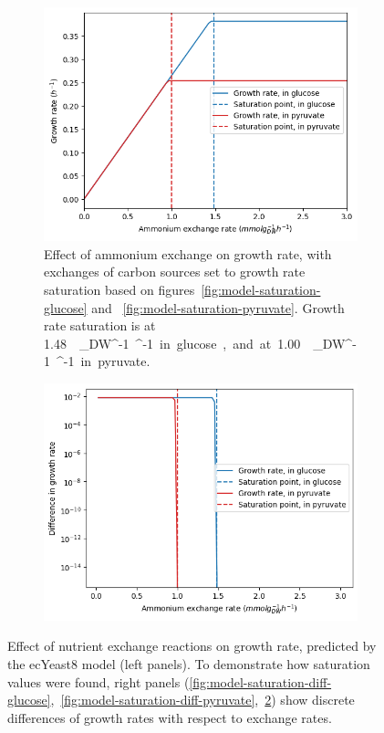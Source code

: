 \begin{figure}
  \begin{subfigure}[t]{0.45\textwidth}
  \centering
    \includegraphics[width=\linewidth]{saturation_amm}
    \caption{
      Effect of ammonium exchange on growth rate, with exchanges of carbon sources set to growth rate saturation based on figures~\ref{fig:model-saturation-glucose} and ~\ref{fig:model-saturation-pyruvate}.
      Growth rate saturation is at \SI{1.48}{\milli\mole~\gram_{DW}^{-1}~\hour^{-1}} in glucose, and
      at \SI{1.00}{\milli\mole~\gram_{DW}^{-1}~\hour^{-1}} in pyruvate.
    }
    \label{fig:model-saturation-ammonium}
  \end{subfigure}%
  \begin{subfigure}[t]{0.45\textwidth}
  \centering
    \includegraphics[width=\linewidth]{saturation_diff_amm}
    \caption{
    }
    \label{fig:model-saturation-diff-ammonium}
  \end{subfigure}

  \caption{
    Effect of nutrient exchange reactions on growth rate, predicted by the ecYeast8 model (left panels).
    To demonstrate how saturation values were found,
    right panels (\ref{fig:model-saturation-diff-glucose},~\ref{fig:model-saturation-diff-pyruvate},~\ref{fig:model-saturation-diff-ammonium}) show discrete differences of growth rates with respect to exchange rates.
  }
  \label{fig:model-saturation}
\end{figure}

